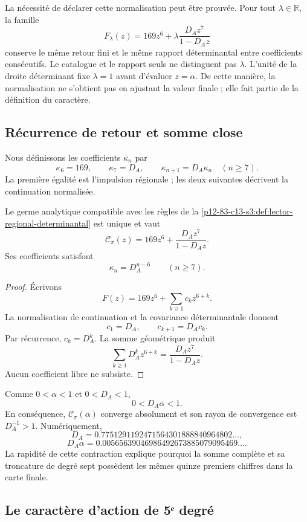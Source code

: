 La nécessité de déclarer cette normalisation peut être prouvée. Pour tout
\(\lambda\in\mathbb R\), la famille
\[
F_\lambda(z)
=169z^6+\lambda\frac{D_Az^7}{1-D_Az}
\]
conserve le même retour fini et le même rapport déterminantal entre
coefficients consécutifs. Le catalogue et le rapport seuls ne distinguent pas
\(\lambda\). L'unité de la droite déterminant fixe
\(\lambda=1\) avant d'évaluer \(z=\alpha\). De cette manière, la normalisation
ne s'obtient pas en ajustant la valeur finale ; elle fait partie de la définition du
caractère.

\subsection{Récurrence de retour et somme close}

Nous définissons les coefficients \(\kappa_n\) par
\[
\kappa_6=169,
\qquad
\kappa_7=D_A,
\qquad
\kappa_{n+1}=D_A\kappa_n\quad(n\ge7).
\]
La première égalité est l'impulsion régionale ; les deux suivantes décrivent la
continuation normalisée.

\begin{theorem}
\label{p12-83-c13-s3:thm:realizacion-analitica-graduada}
Le germe analytique compatible avec les règles de la
\cref{p12-83-c13-s3:def:lector-regional-determinantal} est unique et vaut
\[
\boxed{
\mathscr C_\pi(z)
=169z^6+\frac{D_Az^7}{1-D_Az}.}
\]
Ses coefficients satisfont
\[
\kappa_n=D_A^{n-6}\qquad(n\ge7).
\]
\end{theorem}

\begin{proof}
Écrivons
\[
F(z)=169z^6+\sum_{k\ge1}c_kz^{6+k}.
\]
La normalisation de continuation et la covariance déterminantale donnent
\[
c_1=D_A,
\qquad
c_{k+1}=D_Ac_k.
\]
Par récurrence, \(c_k=D_A^k\). La somme géométrique produit
\[
\sum_{k\ge1}D_A^kz^{6+k}
=\frac{D_Az^7}{1-D_Az}.
\]
Aucun coefficient libre ne subsiste.
\end{proof}

Comme \(0<\alpha<1\) et
\(0<D_A<1\),
\[
0<D_A\alpha<1.
\]
En conséquence, \(\mathscr C_\pi(\alpha)\) converge absolument et son
rayon de convergence est \(D_A^{-1}>1\). Numériquement,
\[
D_A=0.7751291192471564301888840964802\ldots,
\]
\[
D_A\alpha=0.00565639046986492673885079095469\ldots.
\]
La rapidité de cette contraction explique pourquoi la somme complète et sa
troncature de degré sept possèdent les mêmes quinze premiers chiffres dans la
carte finale.

\subsection{Le caractère d'action de 5ᵉ degré}

